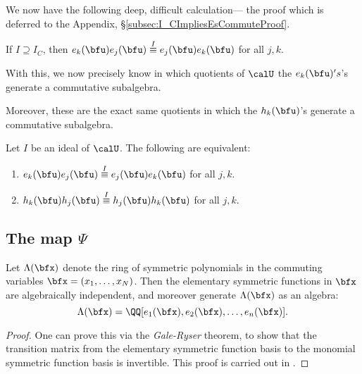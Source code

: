 \documentclass{article}
\begin{document}
We now have the following deep, difficult calculation--- the proof which is deferred to the Appendix, \S\ref{subsec:I_CImpliesEsCommuteProof}.

\begin{theorem}
    \label{thm:ICImpliesEsCommute}
    If $I \supseteq I_C$, then $e_k(\bfu)e_j(\bfu) \overset{I}{\equiv} e_j(\bfu)e_k(\bfu)$ for all $j,k$. 
\end{theorem}

With this, we now precisely know in which quotients of $\calU$ the $e_k(\bfu)'s$'s generate a commutative subalgebra.

Moreover, these are the exact same quotients in which the $h_k(\bfu)$'s generate a commutative subalgebra.

\begin{lemma}
    Let $I$ be an ideal of $\calU$.
    The following are equivalent:
    \begin{enumerate}[label=(\alph*)]
        \item 
            $e_k(\bfu)e_j(\bfu) \overset{I}{\equiv} e_j(\bfu)e_k(\bfu)$ for all $j,k$. 
        \item 
            $h_k(\bfu)h_j(\bfu) \overset{I}{\equiv} h_j(\bfu)h_k(\bfu)$ for all $j,k$.
    \end{enumerate}
\end{lemma}


\subsection{
    The map $\Psi$
}

\begin{theorem}
    \label{thm:FundThmSymFuncs}
    Let $\Lambda(\bfx)$ denote the ring of symmetric polynomials in the commuting variables $\bfx = (x_1,\ldots,x_N)$.
    Then the elementary symmetric functions in $\bfx$ are algebraically independent, and moreover generate $\Lambda(\bfx)$ as an algebra:
    \[
        \Lambda(\bfx)
        =
        \QQ[e_1(\bfx), e_2(\bfx), \ldots, e_n(\bfx)].
    \]
\end{theorem}

\begin{proof}
    One can prove this via the \textit{Gale-Ryser} theorem, to show that the transition matrix from the elementary symmetric function basis to the monomial symmetric function basis is invertible.
    This proof is carried out in \cite[Theorem 7.4.4]{EC2}.
\end{proof}
\end{document}

